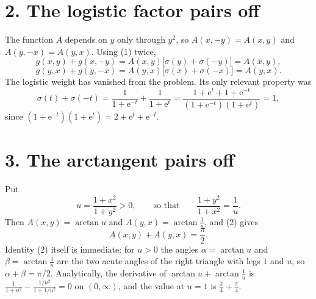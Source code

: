 \documentclass[12pt]{article}
\newcommand{\e}{\mathrm{e}}
\begin{document}
\begin{center}
\end{center}

\section*{2. The logistic factor pairs off}

The function \(A\) depends on \(y\) only through \(y^2\), so
\(A(x,-y)=A(x,y)\) and \(A(y,-x)=A(y,x)\). Using (1) twice,
\[
g(x,y)+g(x,-y)
=A(x,y)\bigl[\sigma(y)+\sigma(-y)\bigr]
=A(x,y),
\tag{5}
\]
\[
g(y,x)+g(y,-x)
=A(y,x)\bigl[\sigma(x)+\sigma(-x)\bigr]
=A(y,x).
\tag{6}
\]
The logistic weight has vanished from the problem. Its only relevant
property was
\[
\sigma(t)+\sigma(-t)
=\frac1{1+\e^{-t}}+\frac1{1+\e^{t}}
=\frac{1+\e^{t}+1+\e^{-t}}{(1+\e^{-t})(1+\e^{t})}
=1,
\]
since \((1+\e^{-t})(1+\e^{t})=2+\e^{t}+\e^{-t}\).

\section*{3. The arctangent pairs off}

Put
\[
u=\frac{1+x^2}{1+y^2}>0,
\qquad\text{so that}\qquad
\frac{1+y^2}{1+x^2}=\frac1u .
\]
Then \(A(x,y)=\arctan u\) and \(A(y,x)=\arctan\frac1u\), and (2) gives
\[
A(x,y)+A(y,x)=\frac\pi2.
\tag{7}
\]
Identity (2) itself is immediate: for \(u>0\) the angles
\(\alpha=\arctan u\) and \(\beta=\arctan\frac1u\) are the two acute
angles of the right triangle with legs \(1\) and \(u\), so
\(\alpha+\beta=\pi/2\). Analytically, the derivative of
\(\arctan u+\arctan\frac1u\) is
\(\frac1{1+u^2}-\frac{1/u^2}{1+1/u^2}=0\) on \((0,\infty)\), and the
value at \(u=1\) is \(\frac\pi4+\frac\pi4\).
\end{document}
